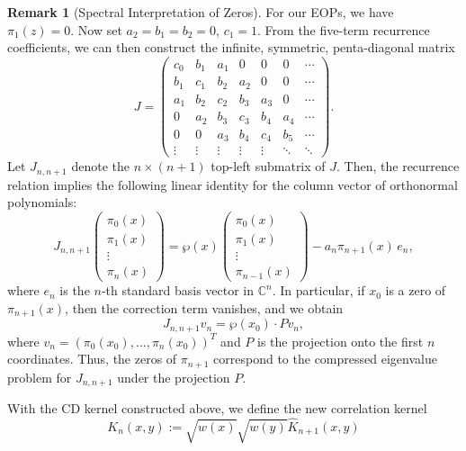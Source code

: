 \documentclass[11pt,a4paper]{article}
\theoremstyle{definition}
\newtheorem{remark}[theorem]{Remark}
\numberwithin{equation}{section}
\numberwithin{theorem}{section}
\begin{document}
\begin{remark}[Spectral Interpretation of Zeros]
For our EOPs, we have $\pi_1(z)=0$. Now set $a_2 = b_1 = b_2 = 0$, $c_1 = 1$. From the five-term recurrence coefficients, we can then construct the infinite, symmetric, penta-diagonal matrix 
\[
J = \begin{pmatrix}
c_0 & b_1 & a_1 & 0 & 0 & 0 & \cdots \\
b_1 & c_1 & b_2 & a_2 & 0 & 0 & \cdots \\
a_1 & b_2 & c_2 & b_3 & a_3 & 0 & \cdots \\
0 & a_2 & b_3 & c_3 & b_4 & a_4 & \cdots \\
0 & 0 & a_3 & b_4 & c_4 & b_5 & \cdots \\
\vdots & \vdots & \vdots & \vdots & \vdots & \ddots & \ddots
\end{pmatrix}.
\]
Let $J_{n,n+1}$ denote the $n \times (n+1)$ top-left submatrix of $J$. Then, the recurrence relation implies the following linear identity for the column vector of orthonormal polynomials:
\[
J_{n,n+1}
\begin{pmatrix}
\pi_0(x) \\
\pi_1(x) \\
\vdots \\
\pi_n(x)
\end{pmatrix}
=
\wp(x)
\begin{pmatrix}
\pi_0(x) \\
\pi_1(x) \\
\vdots \\
\pi_{n-1}(x)
\end{pmatrix}
-
a_n \pi_{n+1}(x) \, e_n,
\]
where $e_n$ is the $n$-th standard basis vector in $\mathbb{C}^n$. In particular, if $x_0$ is a zero of $\pi_{n+1}(x)$, then the correction term vanishes, and we obtain
\[
J_{n,n+1} v_n = \wp(x_0) \cdot P v_n,
\]
where $v_n = (\pi_0(x_0), \dots, \pi_n(x_0))^T$ and $P$ is the projection onto the first $n$ coordinates. Thus, the zeros of $\pi_{n+1}$ correspond to the compressed eigenvalue problem for $J_{n,n+1}$ under the projection $P$.
\end{remark} 

With the CD kernel constructed above, we define the new correlation kernel 
\begin{equation}\label{DPPKer:def}
    K_n(x,y):=\sqrt{w(x)}\sqrt{w(y)}\widehat{K}_{n+1}(x,y)
\end{equation}
\end{document}
